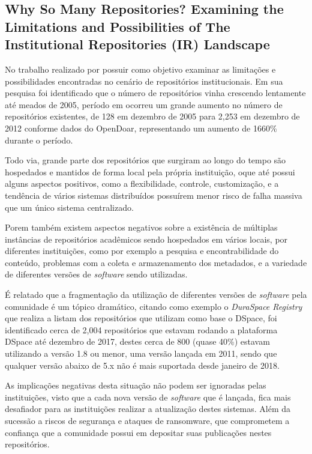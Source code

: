 \subsection{Why So Many Repositories? Examining the Limitations and Possibilities of The Institutional Repositories (IR) Landscape}

No trabalho realizado por \cite{2018:Arlitsch} possuir como objetivo examinar as limitações
e possibilidades encontradas no cenário de repositórios institucionais. Em sua pesquisa
foi identificado que o número de repositórios vinha crescendo lentamente até meados de 2005,
período em ocorreu um grande aumento no número de repositórios existentes, de 128 em dezembro
de 2005 para 2,253 em dezembro de 2012 conforme dados do OpenDoar, representando um aumento
de 1660\% durante o período.

Todo via, grande parte dos repositórios que surgiram ao longo do tempo são hospedados e
mantidos de forma local pela própria instituição, oque até possui alguns aspectos positivos,
como a flexibilidade, controle, customização, e a tendência de vários sistemas distribuídos
possuírem menor risco de falha massiva que um único sistema centralizado.

Porem também existem aspectos negativos sobre a existência de múltiplas instâncias
de repositórios acadêmicos sendo hospedados em vários locais, por diferentes
instituições, como por exemplo a pesquisa e encontrabilidade do conteúdo, problemas
com a coleta e armazenamento dos metadados, e a variedade de diferentes versões de
\emph{software} sendo utilizadas.

É relatado que a fragmentação da utilização de diferentes versões de \emph{software}
pela comunidade é um tópico dramático, citando como exemplo o \emph{DuraSpace Registry}
que realiza a listam dos repositórios que utilizam como base o DSpace, foi identificado
cerca de 2,004 repositórios que estavam rodando a plataforma DSpace até dezembro
de 2017, destes cerca de 800 (quase 40\%) estavam utilizando a versão 1.8 ou
menor, uma versão lançada em 2011, sendo que qualquer versão abaixo de 5.x não é
mais suportada desde janeiro de 2018.

As implicações negativas desta situação não podem ser ignoradas pelas instituições,
visto que a cada nova versão de \emph{software} que é lançada, fica mais desafiador
para as instituições realizar a atualização destes sistemas. Além da sucessão a
riscos de segurança e ataques de ransomware, que comprometem a confiança que a comunidade
possui em depositar suas publicações nestes repositórios.

